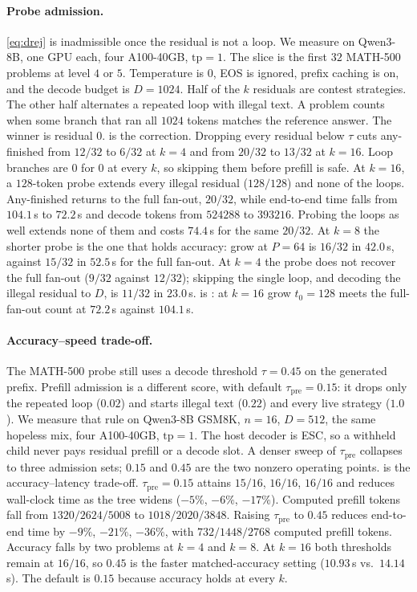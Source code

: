 \paragraph{Probe admission.}
\label{sec:eval-grow}
\eqref{eq:drej} is inadmissible once the residual is not a loop.
We measure  on Qwen3-8B, one GPU each, four A100-40GB, $\mathrm{tp}{=}1$.
The slice is the first $32$ MATH-500 problems at level $4$ or $5$.
Temperature is $0$, EOS is ignored, prefix caching is on, and the decode budget is $D{=}1024$.
Half of the $k$ residuals are contest strategies.
The other half alternates a repeated loop with illegal text.
A problem counts when some branch that ran all $1024$ tokens matches the reference answer.
The winner is residual $0$.
 is the correction.
Dropping every residual below $\tau$ cuts any-finished from $12/32$ to $6/32$ at $k{=}4$ and from $20/32$ to $13/32$ at $k{=}16$.
Loop branches are $0$ for $0$ at every $k$, so skipping them before prefill is safe.
At $k{=}16$, a $128$-token probe extends every illegal residual ($128/128$) and none of the loops.
Any-finished returns to the full fan-out, $20/32$, while end-to-end time falls from $104.1$\,s to $72.2$\,s and decode tokens from $524288$ to $393216$.
Probing the loops as well extends none of them and costs $74.4$\,s for the same $20/32$.
At $k{=}8$ the shorter probe is the one that holds accuracy: grow at $P{=}64$ is $16/32$ in $42.0$\,s, against $15/32$ in $52.5$\,s for the full fan-out.
At $k{=}4$ the probe does not recover the full fan-out ($9/32$ against $12/32$); skipping the single loop, and decoding the illegal residual to $D$, is $11/32$ in $23.0$\,s.
 is : at $k{=}16$ grow $t_0{=}128$ meets the full-fan-out count at $72.2$\,s against $104.1$\,s.

\paragraph{Accuracy--speed trade-off.}
\label{sec:eval-prefill}
The MATH-500 probe still uses a decode threshold $\tau{=}0.45$ on the generated prefix.
Prefill admission is a different score, with default $\tau_{\mathrm{pre}}{=}0.15$: it drops only the repeated loop ($0.02$) and starts illegal text ($0.22$) and every live strategy ($1.0$).
We measure that rule on Qwen3-8B GSM8K, $n{=}16$, $D{=}512$, the same hopeless mix, four A100-40GB, $\mathrm{tp}{=}1$.
The host decoder is ESC, so a withheld child never pays residual prefill or a decode slot.
A denser sweep of $\tau_{\mathrm{pre}}$ collapses to three admission sets; $0.15$ and $0.45$ are the two nonzero operating points.
 is the accuracy--latency trade-off.
$\tau_{\mathrm{pre}}{=}0.15$ attains $15/16$, $16/16$, $16/16$ and reduces wall-clock time as the tree widens ($-5\%$, $-6\%$, $-17\%$).
Computed prefill tokens fall from $1320/2624/5008$ to $1018/2020/3848$.
Raising $\tau_{\mathrm{pre}}$ to $0.45$ reduces end-to-end time by $-9\%$, $-21\%$, $-36\%$, with $732/1448/2768$ computed prefill tokens.
Accuracy falls by two problems at $k{=}4$ and $k{=}8$.
At $k{=}16$ both thresholds remain at $16/16$, so $0.45$ is the faster matched-accuracy setting ($10.93$\,s vs.\ $14.14$\,s).
The default is $0.15$ because accuracy holds at every $k$.

